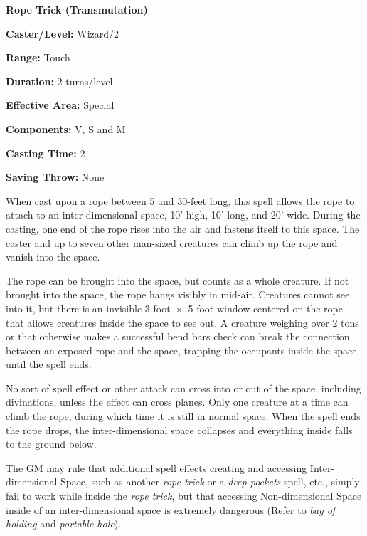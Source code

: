 \begin{multicols}{2}
\vspace{1em}

\noindent
\begin{minipage}{\columnwidth}

\noindent \textbf{Rope Trick (Transmutation)}

\noindent \textbf{Caster/Level:} Wizard/2

\noindent \textbf{Range:} Touch

\noindent \textbf{Duration:} 2 turns/level

\noindent \textbf{Effective Area:} Special

\noindent \textbf{Components:} V, S and M

\noindent \textbf{Casting Time:} 2

\noindent \textbf{Saving Throw:} None

\end{minipage}

When cast upon a rope between 5 and 30-feet long, this spell allows the rope to attach to an inter-dimensional space, 10' high, 10' long, and 20' wide.  During the casting, one end of the rope rises into the air and fastens itself to this space.  The caster and up to seven other man-sized creatures can climb up the rope and vanish into the space.  

The rope can be brought into the space, but counts as a whole creature.  If not brought into the space, the rope hangs visibly in mid-air.  Creatures cannot see into it, but there is an invisible 3-foot~$\times$~5-foot window centered on the rope that allows creatures inside the space to see out.  A creature weighing over 2 tons or that otherwise makes a successful bend bars check can break the connection between an exposed rope and the space, trapping the occupants inside the space until the spell ends.

No sort of spell effect or other attack can cross into or out of the space, including divinations, unless the effect can cross planes.  Only one creature at a time can climb the rope, during which time it is still in normal space.  When the spell ends the rope drops, the inter-dimensional space collapses and everything inside falls to the ground below.  

The GM may rule that additional spell effects creating and accessing Inter-dimensional Space, such as another \textit{rope trick} or a \textit{deep pockets} spell, etc., simply fail to work while inside the \textit{rope trick}, but that accessing Non-dimensional Space inside of an inter-dimensional space is extremely dangerous (Refer to \textit{bag of holding} and \textit{portable hole}).


\end{multicols}
